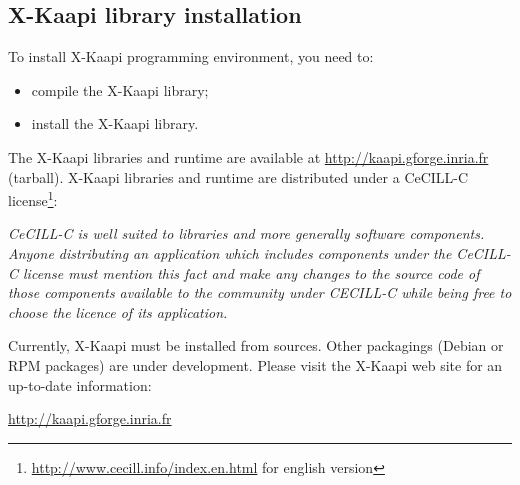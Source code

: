 \documentclass{article}[12pt]
\newcommand{\kaapi}{\textsc{X}-Kaapi\xspace}
\begin{document}
\subsection{\kaapi library installation}

To install \kaapi programming environment, you need to:
\begin{itemize}
\item compile the \kaapi library;
\item install the \kaapi library.
\end{itemize}
The \kaapi libraries and runtime are available at \url{http://kaapi.gforge.inria.fr} (tarball). \kaapi libraries and runtime are distributed under a CeCILL-C license\footnote{\url{http://www.cecill.info/index.en.html} for english version}:
\begin{center}
\begin{minipage}{0.9\linewidth}
\it
CeCILL-C is well suited to libraries and more generally software components. Anyone distributing an application which includes components under the CeCILL-C license must mention this fact and make any changes to the source code of those components available to the community under CECILL-C while being free to choose the licence of its application.\end{minipage}
\end{center}

Currently, \kaapi must be installed from sources. 
Other packagings (Debian or RPM packages) are under development. Please visit the \kaapi web site for an up-to-date information:
\begin{center}
\url{http://kaapi.gforge.inria.fr}
\end{center}

%
\end{document}
